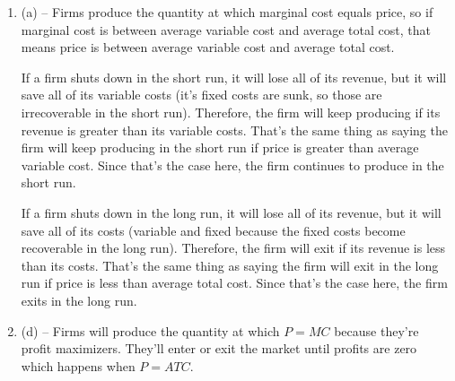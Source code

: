 \documentclass{article}
\begin{document}
\begin{enumerate}
The caveat to that analysis is that a firm might be better off not producing at all. If a firm shuts down in the short run, it won't make any revenue, but it will save all of its variable costs. That means a firm is better off not producing in the short run if its revenue is less than its variable costs. With a little bit of math, we can show that that's the same thing as saying the firm is better off not producing in the short run if the market price is less than average variable cost:
	\begin{align*}
	TR &< VC \\
	\frac{TR}{Q} &< \frac{VC}{Q} \\
	\frac{PQ}{Q} &< AVC \\
	P &< AVC
	\end{align*}
Therefore, in the short run, if price is less than average variable cost, a firm will shut down, but if price is greater than average variable cost, a firm will produce the quantity given by the marginal cost curve. In other words, the firm's short-run supply curve is the marginal cost curve above its average variable cost curve.

\item (a) -- Firms produce the quantity at which marginal cost equals price, so if marginal cost is between average variable cost and average total cost, that means price is between average variable cost and average total cost.

If a firm shuts down in the short run, it will lose all of its revenue, but it will save all of its variable costs (it's fixed costs are sunk, so those are irrecoverable in the short run). Therefore, the firm will keep producing if its revenue is greater than its variable costs. That's the same thing as saying the firm will keep producing in the short run if price is greater than average variable cost. Since that's the case here, the firm continues to produce in the short run.

If a firm shuts down in the long run, it will lose all of its revenue, but it will save all of its costs (variable and fixed because the fixed costs become recoverable in the long run). Therefore, the firm will exit if its revenue is less than its costs. That's the same thing as saying the firm will exit in the long run if price is less than average total cost. Since that's the case here, the firm exits in the long run. 

\item (d) -- Firms will produce the quantity at which $P = MC$ because they're profit maximizers. They'll enter or exit the market until profits are zero which happens when $P = ATC$.


\end{enumerate}
\end{document}
